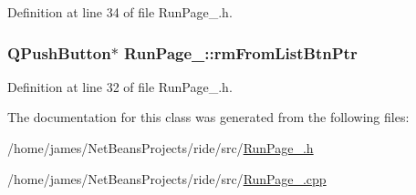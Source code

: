 Definition at line 34 of file Run\-Page\-\_.\-h.

\hypertarget{class_run_page__3_ae38727316495817c8bead962171f0bc7}{
\subsubsection[{rm\-From\-List\-Btn\-Ptr}]{\setlength{\rightskip}{0pt plus 5cm}Q\-Push\-Button$\ast$ Run\-Page\-\_\-::rm\-From\-List\-Btn\-Ptr\hspace{0.3cm}{\ttfamily [private]}}}\label{class_run_page__3_ae38727316495817c8bead962171f0bc7}


Definition at line 32 of file Run\-Page\-\_.\-h.



The documentation for this class was generated from the following files\-:\begin{DoxyCompactItemize}
\item 
/home/james/\-Net\-Beans\-Projects/ride/src/\hyperlink{_run_page__3_8h}{Run\-Page\-\_.\-h}\item 
/home/james/\-Net\-Beans\-Projects/ride/src/\hyperlink{_run_page__3_8cpp}{Run\-Page\-\_.\-cpp}\end{DoxyCompactItemize}
